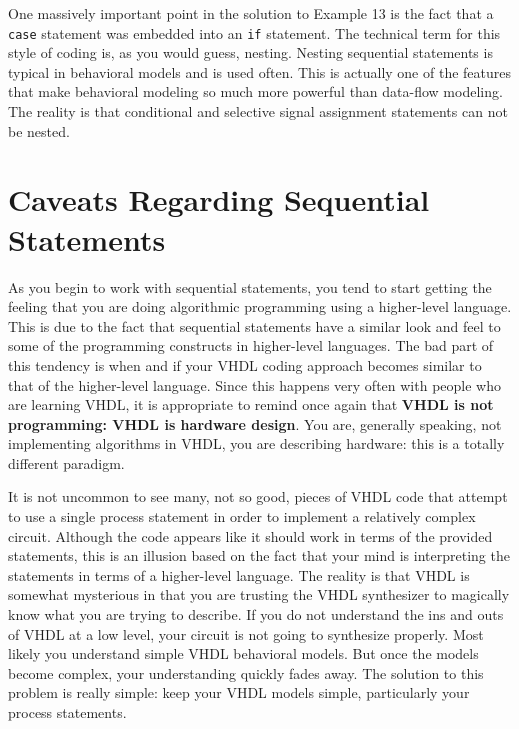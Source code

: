 One massively important point in the solution to Example 13 is the fact that a \texttt{case} statement was embedded into an \texttt{if} statement. The technical term for this style of coding is, as you would guess, nesting. Nesting sequential statements is typical in behavioral models and is used often. This is actually one of the features that make behavioral modeling so much more powerful than data-flow modeling. The reality is that conditional and selective signal assignment statements can not be nested.

\section{Caveats Regarding Sequential Statements}
As you begin to work with sequential statements, you tend to start getting the feeling that you are doing algorithmic programming using a higher-level language. This is due to the fact that sequential statements have a similar look and feel to some of the programming constructs in higher-level languages. The bad part of this tendency is when and if your VHDL coding approach becomes similar to that of the higher-level language. Since this happens very often with people who are learning VHDL, it is appropriate to remind once again that \textbf{VHDL is not programming: VHDL is hardware design}. You are, generally speaking, not implementing algorithms in VHDL, you are describing hardware: this is a totally different paradigm.

It is not uncommon to see many, not so good, pieces of VHDL code that attempt to use a single process statement in order to implement a relatively complex circuit. Although the code appears like it should work in terms of the provided statements, this is an illusion based on the fact that your mind is interpreting the statements in terms of a higher-level language. The reality is that VHDL is somewhat mysterious in that you are trusting the VHDL synthesizer to magically know what you are trying to describe. If you do not understand the ins and outs of VHDL at a low level, your circuit is not going to synthesize properly. Most likely you understand simple VHDL behavioral models. But once the models become complex, your understanding quickly fades away. The solution to this problem is really simple: keep your VHDL models simple, particularly your process statements. 


